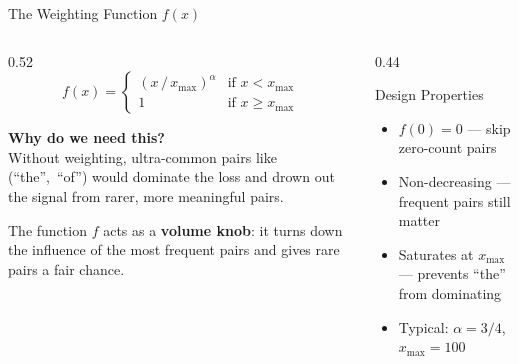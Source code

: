 \documentclass[11pt,aspectratio=169,professionalfonts]{beamer}
\begin{document}
\begin{frame}{The Weighting Function $f(x)$}
  \begin{columns}[T]
    \begin{column}{0.52\textwidth}
      \vspace{6pt}
      \[
        f(x) = \begin{cases}
          (x\,/\,x_{\max})^\alpha & \text{if } x < x_{\max}\\[4pt]
          1 & \text{if } x \geq x_{\max}
        \end{cases}
      \]

      \vspace{8pt}
      \textbf{Why do we need this?}\\[4pt]
      Without weighting, ultra-common pairs like (``the'',~``of'') would dominate the loss and drown out the signal from rarer, more meaningful pairs.

      \vspace{6pt}
      The function $f$ acts as a \textbf{volume knob}: it turns down the influence of the most frequent pairs and gives rare pairs a fair chance.
    \end{column}
    \begin{column}{0.44\textwidth}
      \begin{block}{Design Properties}
        \begin{itemize}
          \item $f(0)=0$ --- skip zero-count pairs
          \item Non-decreasing --- frequent pairs still matter
          \item Saturates at $x_{\max}$ --- prevents ``the'' from dominating
          \item Typical: $\alpha=3/4$,\; $x_{\max}=100$
        \end{itemize}
      \end{block}

      \vspace{4pt}
    \end{column}
  \end{columns}
\end{frame}
\end{document}

